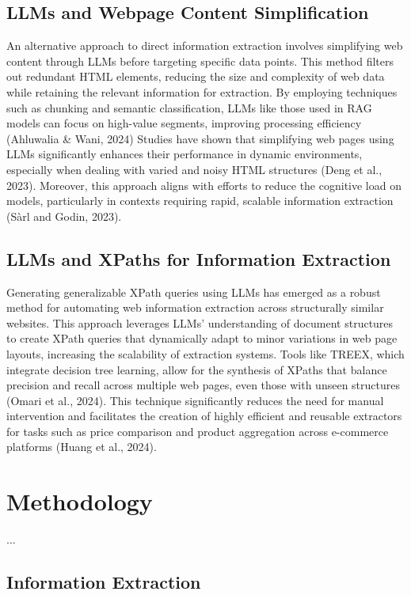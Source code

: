 \documentclass[a4paper]{article}
\begin{document}
\subsection{LLMs and Webpage Content Simplification}
An alternative approach to direct information extraction involves simplifying web content through LLMs before targeting specific data points. This method filters out redundant HTML elements, reducing the size and complexity of web data while retaining the relevant information for extraction. By employing techniques such as chunking and semantic classification, LLMs like those used in RAG models can focus on high-value segments, improving processing efficiency (Ahluwalia & Wani, 2024) Studies have shown that simplifying web pages using LLMs significantly enhances their performance in dynamic environments, especially when dealing with varied and noisy HTML structures (Deng et al., 2023). Moreover, this approach aligns with efforts to reduce the cognitive load on models, particularly in contexts requiring rapid, scalable information extraction (Sàrl and Godin, 2023).
\subsection{LLMs and XPaths for Information Extraction}
Generating generalizable XPath queries using LLMs has emerged as a robust method for automating web information extraction across structurally similar websites. This approach leverages LLMs’ understanding of document structures to create XPath queries that dynamically adapt to minor variations in web page layouts, increasing the scalability of extraction systems. Tools like TREEX, which integrate decision tree learning, allow for the synthesis of XPaths that balance precision and recall across multiple web pages, even those with unseen structures (Omari et al., 2024). This technique significantly reduces the need for manual intervention and facilitates the creation of highly efficient and reusable extractors for tasks such as price comparison and product aggregation across e-commerce platforms (Huang et al., 2024). 
\section{Methodology}

...

\subsection{Information Extraction }
\end{document}
